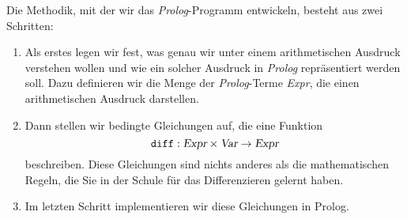 Die Methodik, mit der wir das \textsl{Prolog}-Programm entwickeln, besteht aus zwei
Schritten:
\begin{enumerate}
\item Als erstes legen wir fest, was genau wir unter einem arithmetischen Ausdruck
      verstehen wollen und wie ein solcher Ausdruck in \textsl{Prolog} repr\"{a}sentiert werden soll.  
      Dazu definieren wir die Menge der \textsl{Prolog}-Terme \textsl{Expr}, 
      die einen arithmetischen Ausdruck darstellen.
\item Dann stellen wir bedingte Gleichungen auf, die eine Funktion
      \[ \texttt{diff}: \textsl{Expr} \times \textsl{Var} \rightarrow \textsl{Expr} \]
      beschreiben.  Diese Gleichungen sind nichts anderes als die mathematischen Regeln,
      die Sie in der Schule f\"{u}r das Differenzieren gelernt haben.
\item Im letzten Schritt implementieren wir diese Gleichungen in Prolog.
\end{enumerate}

